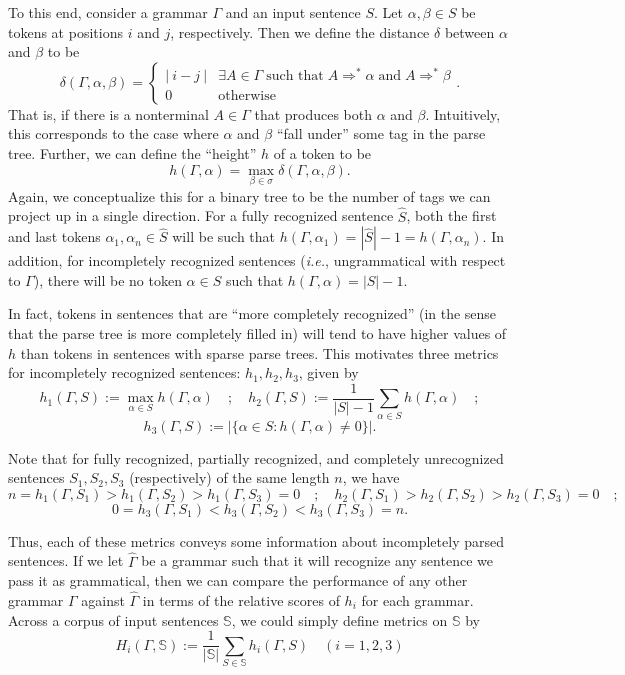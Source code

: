 \documentclass[paper=a4, fontsize=11pt]{scrartcl} %
\begin{document}
To this end, consider a grammar $\Gamma$ and an input sentence $S$.  Let $\alpha, \beta \in S$ be tokens at positions $i$ and $j$, respectively.  Then we define the distance $\delta$ between $\alpha$ and $\beta$ to be $$ \delta(\Gamma, \alpha, \beta) = \begin{cases}
    |\ i-j\ | & \exists A \in \Gamma \;\mbox{such that}\; A \Rightarrow^* \alpha \;\mbox{and}\; A \Rightarrow^* \beta \\
    0 & \mbox{otherwise}
\end{cases}.$$  That is, if there is a nonterminal $A \in \Gamma$ that produces both $\alpha$ and $\beta$.  Intuitively, this corresponds to the case where $\alpha$ and $\beta$ ``fall under'' some tag in the parse tree.  Further, we can define the ``height'' $h$ of a token to be $$ h(\Gamma,\alpha) = \max_{\beta \in \sigma} \delta(\Gamma, \alpha,\beta). $$  Again, we conceptualize this for a binary tree to be the number of tags we can project up in a single direction.  For a fully recognized sentence $\hat{S}$, both the first and last tokens $\alpha_1, \alpha_n \in \hat{S}$ will be such that $h(\Gamma,\alpha_1) = |\hat{S}| - 1 = h(\Gamma,\alpha_n)$.  In addition, for incompletely recognized sentences (\textit{i.e.}, ungrammatical with respect to $\Gamma$), there will be no token $\alpha \in S$ such that $h(\Gamma,\alpha) = |S| - 1$.  

In fact, tokens in sentences that are ``more completely recognized'' (in the sense that the parse tree is more completely filled in) will tend to have higher values of $h$ than tokens in sentences with sparse parse trees.  This motivates three metrics for incompletely recognized sentences: $h_1, h_2, h_3$, given by $$ h_1(\Gamma,S) := \max_{\alpha \in S} h(\Gamma,\alpha) \quad ; \quad h_2(\Gamma,S) := \frac{1}{|S| - 1}\sum_{\alpha \in S} h(\Gamma,\alpha) \quad ;$$ $$  h_3(\Gamma,S) := \left| \{ \alpha \in S : h(\Gamma,\alpha) \neq 0 \} \right|. $$

Note that for fully recognized, partially recognized, and completely unrecognized sentences $S_1, S_2, S_3$ (respectively) of the same length $n$, we have $$ n = h_1(\Gamma,S_1) > h_1(\Gamma,S_2) > h_1(\Gamma,S_3) = 0 \quad;\quad h_2(\Gamma,S_1) > h_2(\Gamma,S_2) > h_2(\Gamma,S_3) = 0 \quad;$$ $$ 0 = h_3(\Gamma,S_1) < h_3(\Gamma,S_2) < h_3(\Gamma,S_3) = n .$$

Thus, each of these metrics conveys some information about incompletely parsed sentences.  If we let $\hat{\Gamma}$ be a grammar such that it will recognize any sentence we pass it as grammatical, then we can compare the performance of any other grammar $\Gamma$ against $\hat{\Gamma}$ in terms of the relative scores of $h_i$ for each grammar.  Across a corpus of input sentences $\mathbb{S}$, we could simply define metrics on $\mathbb{S}$ by $$ H_i(\Gamma,\mathbb{S}) := \frac{1}{|\mathbb{S}|} \sum_{S \in \mathbb{S}} h_i(\Gamma,S) \quad (i = 1,2,3) $$
\end{document}
